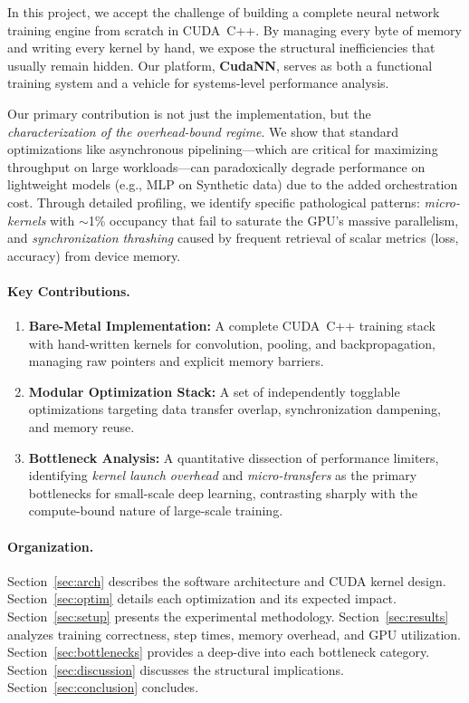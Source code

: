 \documentclass[10pt,twocolumn,letterpaper]{article}
\begin{document}
In this project, we accept the challenge of building a complete neural network training engine from scratch in CUDA~C++.
By managing every byte of memory and writing every kernel by hand, we expose the structural inefficiencies that usually remain hidden.
Our platform, \textbf{CudaNN}, serves as both a functional training system and a vehicle for systems-level performance analysis.

Our primary contribution is not just the implementation, but the \emph{characterization of the overhead-bound regime}.
We show that standard optimizations like asynchronous pipelining---which are critical for maximizing throughput on large workloads---can paradoxically degrade performance on lightweight models (e.g., MLP on Synthetic data) due to the added orchestration cost.
Through detailed profiling, we identify specific pathological patterns: \emph{micro-kernels} with $\sim$1\% occupancy that fail to saturate the GPU's massive parallelism, and \emph{synchronization thrashing} caused by frequent retrieval of scalar metrics (loss, accuracy) from device memory.

\paragraph{Key Contributions.}
\begin{enumerate}[nosep,leftmargin=*]
  \item \textbf{Bare-Metal Implementation:} A complete CUDA~C++ training stack with hand-written kernels for convolution, pooling, and backpropagation, managing raw pointers and explicit memory barriers.
  \item \textbf{Modular Optimization Stack:} A set of independently togglable optimizations targeting data transfer overlap, synchronization dampening, and memory reuse.
  \item \textbf{Bottleneck Analysis:} A quantitative dissection of performance limiters, identifying \emph{kernel launch overhead} and \emph{micro-transfers} as the primary bottlenecks for small-scale deep learning, contrasting sharply with the compute-bound nature of large-scale training.
\end{enumerate}

\paragraph{Organization.}
Section~\ref{sec:arch} describes the software architecture and CUDA kernel design.
Section~\ref{sec:optim} details each optimization and its expected impact.
Section~\ref{sec:setup} presents the experimental methodology.
Section~\ref{sec:results} analyzes training correctness, step times, memory overhead, and GPU utilization.
Section~\ref{sec:bottlenecks} provides a deep-dive into each bottleneck category.
Section~\ref{sec:discussion} discusses the structural implications.
Section~\ref{sec:conclusion} concludes.
\end{document}
